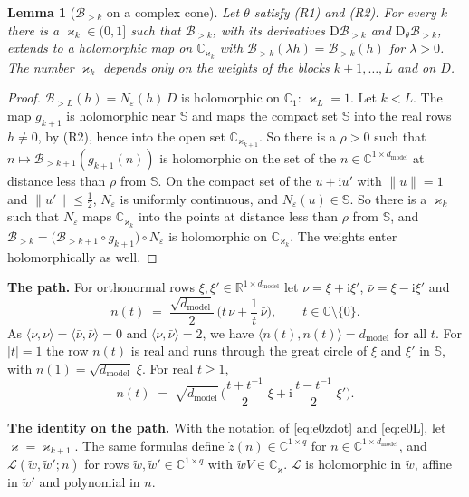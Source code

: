 \documentclass[10pt]{article}
\newtheorem{lemma}[theorem]{Lemma}
\theoremstyle{definition}
\theoremstyle{remark}
\newcommand{\R}{\mathbb{R}}
\newcommand{\dm}{d_{\mathrm{model}}}
\newcommand{\Der}{\mathrm{D}}
\newcommand{\norm}[1]{\lVert #1\rVert}
\newcommand{\para}[1]{\smallskip\noindent\textbf{#1}\hspace{0.5em}}
\begin{document}
\begin{lemma}[$\mathcal B_{>k}$ on a complex cone]\label{lem:e0cone}
Let $\theta$ satisfy (R1) and (R2). For every $k$ there is a $\varkappa_k \in (0, 1]$ such that $\mathcal B_{>k}$, with its derivatives $\Der\mathcal B_{>k}$ and $\Der_\theta\mathcal B_{>k}$, extends to a holomorphic map on $\mathbb C_{\varkappa_k}$ with $\mathcal B_{>k}(\lambda h) = \mathcal B_{>k}(h)$ for $\lambda > 0$. The number $\varkappa_k$ depends only on the weights of the blocks $k+1, \dots, L$ and on $D$.
\end{lemma}

\begin{proof}
$\mathcal B_{>L}(h) = N_\varepsilon(h)\,D$ is holomorphic on $\mathbb C_1$: $\varkappa_L = 1$. Let $k < L$. The map $g_{k+1}$ is holomorphic near $\mathbb S$ and maps the compact set $\mathbb S$ into the real rows $h \neq 0$, by (R2), hence into the open set $\mathbb C_{\varkappa_{k+1}}$. So there is a $\rho > 0$ such that $n \mapsto \mathcal B_{>k+1}(g_{k+1}(n))$ is holomorphic on the set of the $n \in \mathbb C^{1\times\dm}$ at distance less than $\rho$ from $\mathbb S$. On the compact set of the $u + \mathrm iu'$ with $\norm{u} = 1$ and $\norm{u'} \le \frac12$, $N_\varepsilon$ is uniformly continuous, and $N_\varepsilon(u) \in \mathbb S$. So there is a $\varkappa_k$ such that $N_\varepsilon$ maps $\mathbb C_{\varkappa_k}$ into the points at distance less than $\rho$ from $\mathbb S$, and $\mathcal B_{>k} = \big(\mathcal B_{>k+1}\circ g_{k+1}\big)\circ N_\varepsilon$ is holomorphic on $\mathbb C_{\varkappa_k}$. The weights enter holomorphically as well.
\end{proof}

\para{The path.} For orthonormal rows $\xi, \xi' \in \R^{1\times\dm}$ let $\nu = \xi + \mathrm i\xi'$, $\bar\nu = \xi - \mathrm i\xi'$ and
\[
n(t) \;=\; \frac{\sqrt{\dm}}{2}\,\Big(t\,\nu + \frac{1}{t}\,\bar\nu\Big), \qquad t \in \mathbb C\setminus\{0\}.
\]
As $\langle\nu, \nu\rangle = \langle\bar\nu, \bar\nu\rangle = 0$ and $\langle\nu, \bar\nu\rangle = 2$, we have $\langle n(t), n(t)\rangle = \dm$ for all $t$. For $\lvert t\rvert = 1$ the row $n(t)$ is real and runs through the great circle of $\xi$ and $\xi'$ in $\mathbb S$, with $n(1) = \sqrt{\dm}\;\xi$. For real $t \ge 1$,
\begin{equation}\label{eq:e0path}
n(t) \;=\; \sqrt{\dm}\,\Big(\frac{t + t^{-1}}{2}\;\xi + \mathrm i\,\frac{t - t^{-1}}{2}\;\xi'\Big).
\end{equation}

\para{The identity on the path.} With the notation of \eqref{eq:e0zdot} and \eqref{eq:e0L}, let $\varkappa = \varkappa_{k+1}$. The same formulas define $\dot z(n) \in \mathbb C^{1\times q}$ for $n \in \mathbb C^{1\times\dm}$, and $\mathcal L(\tilde w, \tilde w'; n)$ for rows $\tilde w, \tilde w' \in \mathbb C^{1\times q}$ with $\tilde wV \in \mathbb C_\varkappa$. $\mathcal L$ is holomorphic in $\tilde w$, affine in $\tilde w'$ and polynomial in $n$.
\end{document}
